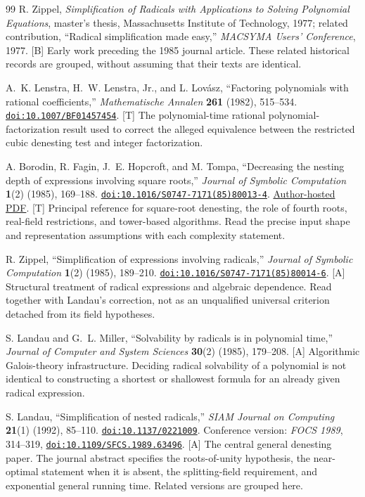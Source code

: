 \documentclass[11pt,a4paper]{article}
\numberwithin{equation}{section}
\theoremstyle{definition}\newtheorem{definition}[theorem]{Definition}
\theoremstyle{remark}\newtheorem{remark}[theorem]{Remark}
\newcommand{\doi}[1]{\href{https://doi.org/#1}{\nolinkurl{doi:#1}}}
\newcommand{\access}[2]{\href{#1}{#2}}
\newcommand{\status}[1]{\textsf{\footnotesize[#1]}}
\begin{document}
\begin{thebibliography}{99}
 R. Zippel, \emph{Simplification of Radicals with Applications to Solving Polynomial Equations}, master's thesis, Massachusetts Institute of Technology, 1977; related contribution, ``Radical simplification made easy,'' \emph{MACSYMA Users' Conference}, 1977. \status{B}
Early work preceding the 1985 journal article. These related historical records are grouped, without assuming that their texts are identical.

 A.~K. Lenstra, H.~W. Lenstra, Jr., and L. Lov\'asz, ``Factoring polynomials with rational coefficients,'' \emph{Mathematische Annalen} \textbf{261} (1982), 515--534. \doi{10.1007/BF01457454}. \status{T}
The polynomial-time rational polynomial-factorization result used to correct the alleged equivalence between the restricted cubic denesting test and integer factorization.

 A. Borodin, R. Fagin, J.~E. Hopcroft, and M. Tompa, ``Decreasing the nesting depth of expressions involving square roots,'' \emph{Journal of Symbolic Computation} \textbf{1}(2) (1985), 169--188. \doi{10.1016/S0747-7171(85)80013-4}.
\access{https://www.cs.toronto.edu/~bor/Papers/decreasing-nesting-depth-for-expressions.pdf}{Author-hosted PDF}. \status{T}
Principal reference for square-root denesting, the role of fourth roots, real-field restrictions, and tower-based algorithms. Read the precise input shape and representation assumptions with each complexity statement.

 R. Zippel, ``Simplification of expressions involving radicals,'' \emph{Journal of Symbolic Computation} \textbf{1}(2) (1985), 189--210. \doi{10.1016/S0747-7171(85)80014-6}. \status{A}
Structural treatment of radical expressions and algebraic dependence. Read together with Landau's correction, not as an unqualified universal criterion detached from its field hypotheses.

 S. Landau and G.~L. Miller, ``Solvability by radicals is in polynomial time,'' \emph{Journal of Computer and System Sciences} \textbf{30}(2) (1985), 179--208. \status{A}
Algorithmic Galois-theory infrastructure. Deciding radical solvability of a polynomial is not identical to constructing a shortest or shallowest formula for an already given radical expression.

 S. Landau, ``Simplification of nested radicals,'' \emph{SIAM Journal on Computing} \textbf{21}(1) (1992), 85--110. \doi{10.1137/0221009}. Conference version: \emph{FOCS 1989}, 314--319, \doi{10.1109/SFCS.1989.63496}. \status{A}
The central general denesting paper. The journal abstract specifies the roots-of-unity hypothesis, the near-optimal statement when it is absent, the splitting-field requirement, and exponential general running time. Related versions are grouped here.


\end{thebibliography}
\end{document}

